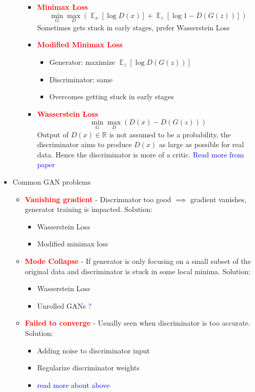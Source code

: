 \documentclass{article}
\DeclareMathOperator*{\E}{\mathop{\mathbb{E}}}
\newcommand{\redb}[1]{\textcolor{red}{\textbf{#1}}}
\newcommand{\blue}[1]{\textcolor{blue}{#1}}
\begin{document}
\begin{itemize}
\begin{itemize}
            \begin{itemize}
                \item \redb{Minimax Loss}
                    $$\min_G \max_D \left( \E_{x}{[\log {D(x)}]} + \E_{z}{[\log{1-D(G(z))}]} \right)$$
                    Sometimes gets stuck in early stages, prefer Wasserstein Loss
                \item \redb{Modified Minimax Loss}
                    \begin{itemize}
                        \item Generator: maximize $\E_{z}{[\log{D(G(z))}]}$
                        \item Discriminator: same
                        \item Overcomes getting stuck in early stages
                    \end{itemize}
                \item \redb{Wasserstein Loss}
                    $$\min_G \max_D \left( D(x)-D(G(z)) \right)$$
                    Output of $D(x) \in \mathbb{R}$ is not assumed to be a probability, the discriminator aims to produce $D(x)$ as large as possible for real data. Hence the discriminator is more of a critic. \blue{Read more from paper}
                    
            \end{itemize}
        \end{itemize}
    \item Common GAN problems
        \begin{itemize}
            \item \redb{Vanishing gradient} - Discrimnator too good $\implies$ gradient vanishes, generator training is impacted. Solution:
                \begin{itemize}
                    \item Wasserstein Loss
                    \item Modified minimax loss
                \end{itemize}
            \item \redb{Mode Collapse} - If generator is only focusing on a small subset of the original data and discriminator is stuck in some local minima. Solution:
                \begin{itemize}
                    \item Wasserstein Loss
                    \item Unrolled GANs \blue{?}
                \end{itemize}
            \item \redb{Failed to converge} - Usually seen when discriminator is too accurate. Solution:
                \begin{itemize}
                    \item Adding noise to discriminator input
                    \item Regularize discriminator weights
                    \item \blue{read more about above}
                \end{itemize}
        \end{itemize}
\end{itemize}
\end{document}

